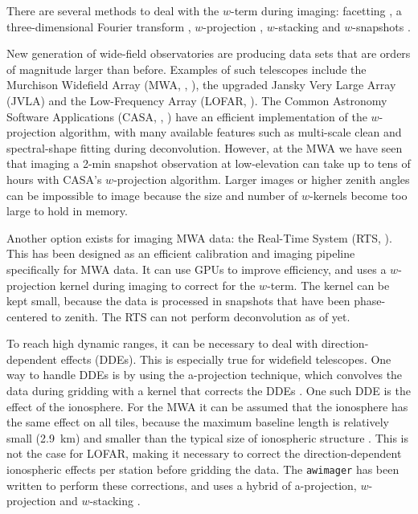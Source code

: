 \documentclass[useAMS,usenatbib]{mn2e}
\begin{document}
There are several methods to deal with the $w$-term during imaging: facetting \citep{facetting-cornwell}, a three-dimensional Fourier transform \citep{perley-noncoplanar-arrays}, $w$-projection \citep{wprojection-cornwell}, $w$-stacking \citep{ska-memo-regridding-2011} and $w$-snapshots \citep{widefield-imaging-ska-cornwell}.

New generation of wide-field observatories are producing data sets that are orders of magnitude larger than before. Examples of such telescopes include the Murchison Widefield Array (MWA, \citealt{mwa-design-2009}, \citealt{mwa}), the upgraded Jansky Very Large Array (JVLA) and the Low-Frequency Array (LOFAR, \citealt{lofar-2013}). The Common Astronomy Software Applications (CASA, \citealt{casa-2007}, \citealt{casa-2008}) have an efficient implementation of the $w$-projection algorithm, with many available features such as multi-scale clean and spectral-shape fitting during deconvolution. However, at the MWA we have seen that imaging a 2-min snapshot observation at low-elevation can take up to tens of hours with CASA's $w$-projection algorithm. Larger images or higher zenith angles can be impossible to image because the size and number of $w$-kernels become too large to hold in memory.

Another option exists for imaging MWA data: the Real-Time System (RTS, \citealt{rts-mwa}). This has been designed as an efficient calibration and imaging pipeline specifically for MWA data. It can use GPUs to improve efficiency, and uses a $w$-projection kernel during imaging to correct for the $w$-term. The kernel can be kept small, because the data is processed in snapshots that have been phase-centered to zenith. The RTS can not perform deconvolution as of yet.

To reach high dynamic ranges, it can be necessary to deal with direction-dependent effects (DDEs). This is especially true for widefield telescopes. One way to handle DDEs is by using the a-projection technique, which convolves the data during gridding with a kernel that corrects the DDEs \citep{aprojection-2008}.
One such DDE is the effect of the ionosphere. For the MWA it can be assumed that the ionosphere has the same effect on all tiles, because the maximum baseline length is relatively small (2.9~km) and smaller than the typical size of ionospheric structure \citep{lonsdale-calibration-approaches-ionosphere}. This is not the case for LOFAR, making it necessary to correct the direction-dependent ionospheric effects per station before gridding the data. The \texttt{awimager} has been written to perform these corrections, and uses a hybrid of a-projection, $w$-projection and $w$-stacking \citep{awimager-2013}.
\end{document}

